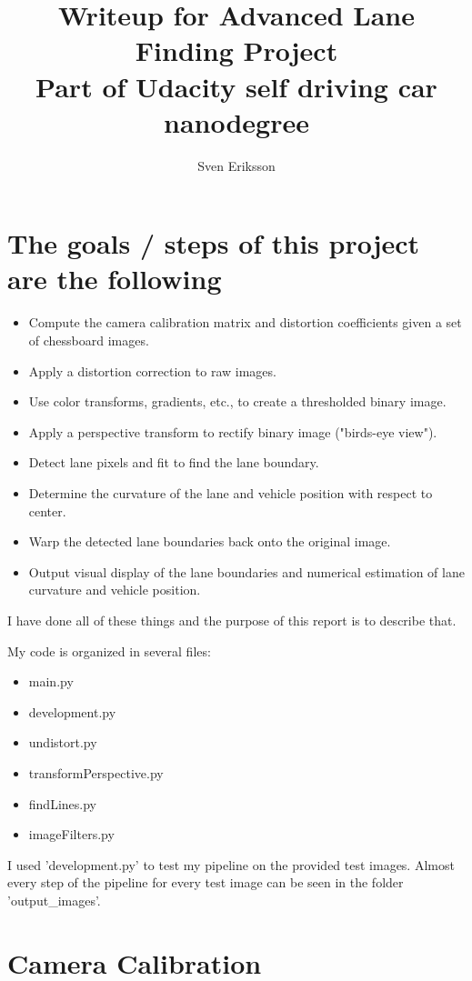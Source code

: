 \documentclass[12pt,a4paper]{article}
\author{Sven Eriksson}
\title{Writeup for Advanced Lane Finding Project \\ \large{Part of Udacity self driving car nanodegree}}
\begin{document}
\maketitle

\section*{The goals / steps of this project are the following}
\begin{itemize}
\item Compute the camera calibration matrix and distortion coefficients given a set of chessboard images.
\item Apply a distortion correction to raw images.
\item Use color transforms, gradients, etc., to create a thresholded binary image.
\item Apply a perspective transform to rectify binary image ("birds-eye view").
\item Detect lane pixels and fit to find the lane boundary.
\item Determine the curvature of the lane and vehicle position with respect to center.
\item Warp the detected lane boundaries back onto the original image.
\item Output visual display of the lane boundaries and numerical estimation of lane curvature and vehicle position.
\end{itemize}

I have done all of these things and the purpose of this report is to describe that.

My code is organized in several files:
\begin{itemize}
\item main.py
\item development.py
\item undistort.py
\item transformPerspective.py
\item findLines.py
\item imageFilters.py
\end{itemize}

I used 'development.py' to test my pipeline on the provided test images. Almost every step of the pipeline for every test image can be seen in the folder 'output\_images'.

\section{Camera Calibration}
\end{document}
